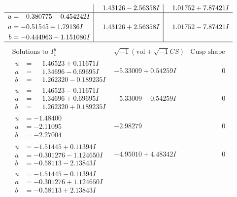 \documentclass[1p]{elsarticle_modified}
\theoremstyle{definition}
\newcommand{\I}{\sqrt{-1}}
\begin{document}
$$\begin{array}{c|c|c}
 & \phantom{-}1.43126 - 2.56358 I & \phantom{-}1.01752 + 7.87421 I \\ \hline\begin{aligned}
u &= \phantom{-}0.380775 - 0.454242 I \\
a &= -0.51545 + 1.79136 I \\
b &= -0.444963 - 1.151080 I\end{aligned}
 & \phantom{-}1.43126 + 2.56358 I & \phantom{-}1.01752 - 7.87421 I\\
 \hline 
 \end{array}$$\newpage$$\begin{array}{c|c|c}  
\text{Solutions to }I^u_{1}& \I (\text{vol} + \sqrt{-1}CS) & \text{Cusp shape}\\
 \hline 
\begin{aligned}
u &= \phantom{-}1.46523 + 0.11671 I \\
a &= \phantom{-}1.34696 - 0.69695 I \\
b &= \phantom{-}1.262320 - 0.189235 I\end{aligned}
 & -5.33009 + 0.54259 I & \phantom{-0.000000 } 0 \\ \hline\begin{aligned}
u &= \phantom{-}1.46523 - 0.11671 I \\
a &= \phantom{-}1.34696 + 0.69695 I \\
b &= \phantom{-}1.262320 + 0.189235 I\end{aligned}
 & -5.33009 - 0.54259 I & \phantom{-0.000000 } 0 \\ \hline\begin{aligned}
u &= -1.48400\phantom{ +0.000000I} \\
a &= -2.11095\phantom{ +0.000000I} \\
b &= -2.27004\phantom{ +0.000000I}\end{aligned}
 & -2.98279\phantom{ +0.000000I} & \phantom{-0.000000 } 0 \\ \hline\begin{aligned}
u &= -1.51445 + 0.11394 I \\
a &= -0.301276 - 1.124650 I \\
b &= -0.58113 - 2.13843 I\end{aligned}
 & -4.95010 + 4.48342 I & \phantom{-0.000000 } 0 \\ \hline\begin{aligned}
u &= -1.51445 - 0.11394 I \\
a &= -0.301276 + 1.124650 I \\
b &= -0.58113 + 2.13843 I\end{aligned}

\end{array}$$
\end{document}
